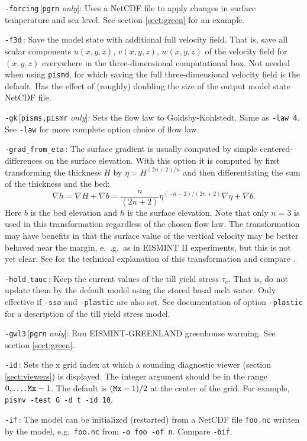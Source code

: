 \documentclass[11pt,final]{amsart}
\renewcommand{\t}[1]{\texttt{#1}}
\newcommand{\grad}{\nabla}
\newcommand{\rawopt}[1]{\vspace{1mm}\noindent \large\texttt{-#1}\normalsize}
\newcommand{\opt}[1]{\rawopt{#1}\,:\quad}
\newcommand{\optrestrict}[2]{\rawopt{#1}\,[\texttt{#2} \textsl{only}]:\quad}
\newcommand{\und}{$\underline{\,\,\,}$}
\begin{document}
\optrestrict{forcing}{pgrn}    Uses a NetCDF file to apply changes in surface temperature and sea level. See section \ref{sect:green} for an example.

\opt{f3d}  Save the model state with additional full velocity field.  That is, save all scalar components $u(x,y,z)$, $v(x,y,z)$, $w(x,y,z)$ of the velocity field for $(x,y,z)$ everywhere in the three-dimensional computational box.  Not needed when using \verb|pismd|, for which saving the full three-dimensional velocity field is the default.  Has the effect of (roughly) doubling the size of the output model state NetCDF file.

\optrestrict{gk}{pisms,pismr}  Sets the flow law to Goldsby-Kohlstedt.  Same as \verb|-law 4|.  See \verb|-law| for more complete option choice of flow law.

\opt{grad\und from\und eta}  The surface gradient is usually computed by simple centered-differences on the surface elevation.  With this option it is computed by first transforming the thickness $H$ by $\eta = H^{(2n+2)/n}$ and then differentiating the sum of the thickness and the bed:
	$$\grad h = \grad H + \grad b = \frac{n}{(2n+2)} \eta^{(-n-2)/(2n+2)} \nabla \eta + \nabla b.$$
Here $b$ is the bed elevation and $h$ is the surface elevation.  Note that only $n=3$ is used in this transformation regardless of the chosen flow law.  The transformation may have benefits in that the surface value of the vertical velocity may be better behaved near the margin, e.~.g.~as in EISMINT II experiments, but this is not yet clear.  See \cite{CDDSV} for the technical explanation of this transformation and compare \cite{SaitoMargin}.

\opt{hold\und tauc}    Keep the current values of the till yield stress $\tau_c$.  That is, do not update them by the default model using the stored basal melt water.  Only effective if \verb|-ssa| and \verb|-plastic| are also set.  See documentation of option \verb|-plastic| for a description of the till yield stress model.

\optrestrict{gwl3}{pgrn}    Run EISMINT-GREENLAND greenhouse warming. See section \ref{sect:green}.

\opt{id}  Sets the x grid index at which a sounding diagnostic viewer (section \ref{sect:viewers}) is displayed.  The integer argument should be in the range $0,\dots,\text{\t{Mx}}-1$.  The default is $(\text{\t{Mx}}-1)/2$ at the center of the grid.  For example, \verb|pismv -test G -d t -id 10|.

\opt{if}  The model can be initialized (restarted) from a NetCDF file \verb|foo.nc| written by the model, e.g.~\verb|foo.nc| from \verb|-o foo -of n|.  Compare \verb|-bif|.
\end{document}
